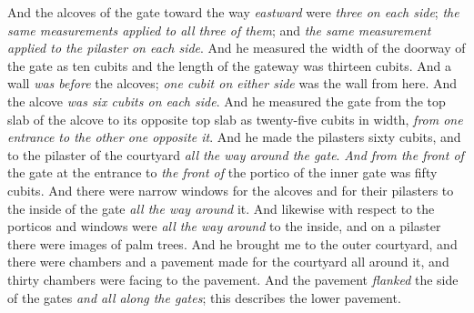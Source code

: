 \begin{biblechapter}
\verse And the alcoves of the gate toward the way \textit{eastward} were \textit{three on each side}; \textit{the same measurements applied to all three of them}; and \textit{the same measurement applied to the pilaster} \textit{on each side}.
\verse And he measured the width of the doorway of the gate as ten cubits and the length of the gateway was thirteen cubits.
\verse And a wall \textit{was before} the alcoves; \textit{one cubit on either side} was the wall from here. And the alcove \textit{was six cubits on each side}.
\verse And he measured the gate from the top slab of the alcove to its opposite top slab as twenty-five cubits in width, \textit{from one entrance to the other one opposite it}.
\verse And he made the pilasters sixty cubits, and to the pilaster of the courtyard \textit{all the way around the gate}.
\verse \textit{And from the front of} the gate at the entrance to \textit{the front of} the portico of the inner gate was fifty cubits.
\verse And there were narrow windows for the alcoves and for their pilasters to the inside of the gate \textit{all the way around} it. And likewise with respect to the porticos and windows were \textit{all the way around} to the inside, and on a pilaster there were images of palm trees.
 And he brought me to the outer courtyard, and there were chambers and a pavement made for the courtyard all around it, and thirty chambers were facing to the pavement.
\verse And the pavement \textit{flanked} the side of the gates \textit{and all along the gates}; this describes the lower pavement.

\end{biblechapter}
